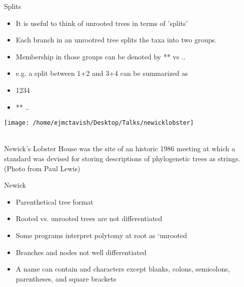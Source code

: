 \documentclass{beamer}
\begin{document}
\begin{frame}
Splits\\
\begin{itemize}
 \item It is useful to think of unrooted trees in terms of 'splits'
 \item Each branch in an unrootred tree splits the taxa into two groups.
 \item Membership in those groups can be denoted by ** vs .. 
 \item e.g. a split between 1+2 and 3+4 can be summarized as
 \item 1234
 \item ** ..
\end{itemize}
\end{frame}





\begin{frame}
\end{frame}


\begin{frame}
\begin{centering}
\texttt{[image: /home/ejmctavish/Desktop/Talks/newicklobster]}
\end{centering}\\
 Newick’s Lobster House was the site of an historic 1986 meeting 
 at which a standard was devised for storing descriptions of 
 phylogenetic trees as strings. 
 (Photo from Paul Lewis)
\end{frame}







\begin{frame}
Newick\\
\begin{itemize}
 \item Parenthetical tree format
 \item Rooted vs. unrooted trees are not differentiated
 \item Some programs interpret polytomy at root as `unrooted
 \item Branches and nodes not well differentiated
 \item A name can contain and characters except blanks, colons, semicolons, parentheses, and square brackets
\end{itemize}
\end{frame}
\end{document}
